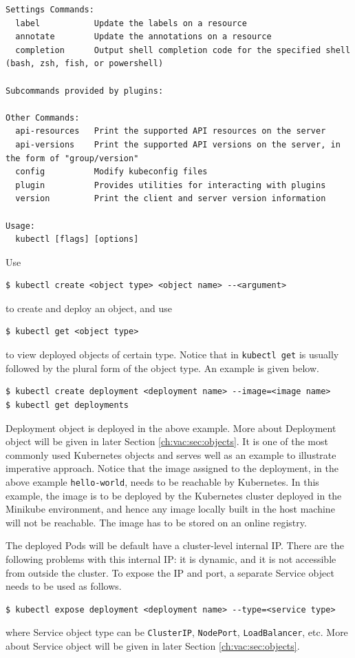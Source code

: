 \begin{lstlisting}
Settings Commands:
  label           Update the labels on a resource
  annotate        Update the annotations on a resource
  completion      Output shell completion code for the specified shell (bash, zsh, fish, or powershell)

Subcommands provided by plugins:

Other Commands:
  api-resources   Print the supported API resources on the server
  api-versions    Print the supported API versions on the server, in the form of "group/version"
  config          Modify kubeconfig files
  plugin          Provides utilities for interacting with plugins
  version         Print the client and server version information

Usage:
  kubectl [flags] [options]
\end{lstlisting}

Use
\begin{lstlisting}
$ kubectl create <object type> <object name> --<argument>
\end{lstlisting}
to create and deploy an object, and use
\begin{lstlisting}
$ kubectl get <object type>
\end{lstlisting}
to view deployed objects of certain type. Notice that in \verb|kubectl get| is usually followed by the plural form of the object type. An example is given below.
\begin{lstlisting}
$ kubectl create deployment <deployment name> --image=<image name>
$ kubectl get deployments
\end{lstlisting}
Deployment object is deployed in the above example. More about Deployment object will be given in later Section \ref{ch:vac:sec:objects}. It is one of the most commonly used Kubernetes objects and serves well as an example to illustrate imperative approach. Notice that the image assigned to the deployment, in the above example \texttt{hello-world}, needs to be reachable by Kubernetes. In this example, the image is to be deployed by the Kubernetes cluster deployed in the Minikube environment, and hence any image locally built in the host machine will not be reachable. The image has to be stored on an online registry.

The deployed Pods will be default have a cluster-level internal IP. There are the following problems with this internal IP: it is dynamic, and it is not accessible from outside the cluster. To expose the IP and port, a separate Service object needs to be used as follows.
\begin{lstlisting}
$ kubectl expose deployment <deployment name> --type=<service type>
\end{lstlisting}
where Service object type can be \verb|ClusterIP|, \verb|NodePort|, \verb|LoadBalancer|, etc. More about Service object will be given in later Section \ref{ch:vac:sec:objects}.

